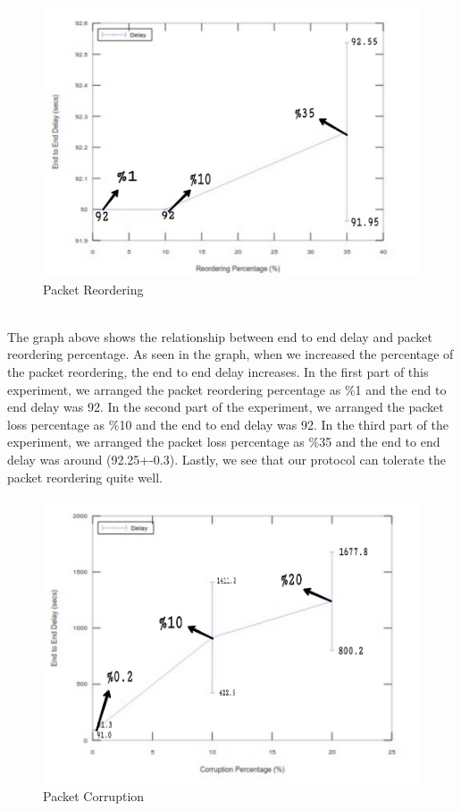 \documentclass[conference]{IEEEtran}
\begin{document}
\begin{figure}[ht]
  \includegraphics[width=\linewidth]{reordering.jpeg}
  \caption{Packet Reordering}
  \label{fig:boat1}
\end{figure}\\

The graph above shows the relationship between end to end delay and packet reordering percentage. As seen in the graph, when we increased the percentage of the packet reordering, the end to end delay increases. In the first part of this experiment, we arranged the packet reordering percentage as \%1 and the end to end delay was 92. In the second part of the experiment, we arranged the packet loss percentage as \%10 and the end to end delay was 92. In the third part of the experiment, we arranged the packet loss percentage as \%35 and the end to end delay was around (92.25+-0.3). Lastly, we see that our protocol can tolerate the packet reordering quite well.

\begin{figure}[ht]
  \includegraphics[width=\linewidth]{corruption.jpeg}
  \caption{Packet Corruption}
  \label{fig:boat1}
\end{figure}\\
\end{document}
